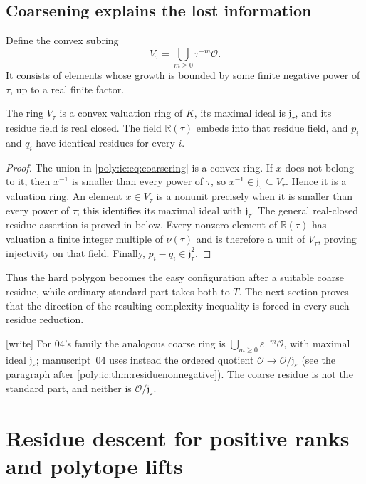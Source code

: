 \documentclass[11pt,a4paper]{article}
\numberwithin{equation}{section}
\theoremstyle{plain}
\newcommand{\wtag}{\textup{[write]}}%
\newcommand{\R}{\mathbb R}
\newcommand{\eps}{\varepsilon}
\newcommand{\OO}{\mathcal O}
\newcommand{\JJ}{\mathfrak j}
\begin{document}
\subsection{Coarsening explains the lost information}
Define the convex subring
\begin{equation}\label{poly:ic:eq:coarsering}
 V_\tau=\bigcup_{m\geq0}\tau^{-m}\OO.
\end{equation}
It consists of elements whose growth is bounded by some finite negative
power of $\tau$, up to a real finite factor.

\begin{proposition}
\label{poly:ic:prop:coarsering}
The ring $V_\tau$ is a convex valuation ring of $K$, its maximal ideal is
$\JJ_\tau$, and its residue field is real closed. The field $\R(\tau)$
embeds into that residue field, and $p_i$ and $q_i$ have identical
residues for every $i$.
\end{proposition}
\begin{proof}
The union in \eqref{poly:ic:eq:coarsering} is a convex ring. If $x$ does not
belong to it, then $x^{-1}$ is smaller than every power of $\tau$,
so $x^{-1}\in\JJ_\tau\subseteq V_\tau$. Hence it is a valuation ring.
An element $x\in V_\tau$ is a nonunit precisely when it is smaller than
every power of $\tau$; this identifies its maximal ideal with
$\JJ_\tau$. The general real-closed residue assertion is proved in
 below. Every nonzero element of $\R(\tau)$ has
valuation a finite integer multiple of $\nu(\tau)$ and is therefore a
unit of $V_\tau$, proving injectivity on that field. Finally,
$p_i-q_i\in\JJ_\tau^2$.
\end{proof}

Thus the hard polygon becomes the easy configuration after a suitable
coarse residue, while ordinary standard part takes both to $T$. The
next section proves that the direction of the resulting complexity
inequality is forced in every such residue reduction.

\wtag{} For 04's family the analogous coarse ring is
$\bigcup_{m\geq0}\eps^{-m}\OO$, with maximal ideal $\JJ_\eps$; manuscript~04
uses instead the ordered quotient $\OO\to\OO/\JJ_\eps$ (see the paragraph
after \cref{poly:ic:thm:residuenonnegative}). The coarse residue is not the
standard part, and neither is $\OO/\JJ_\eps$.

\section{Residue descent for positive ranks and polytope lifts}\label{poly:ic:sec:residue}
\end{document}
